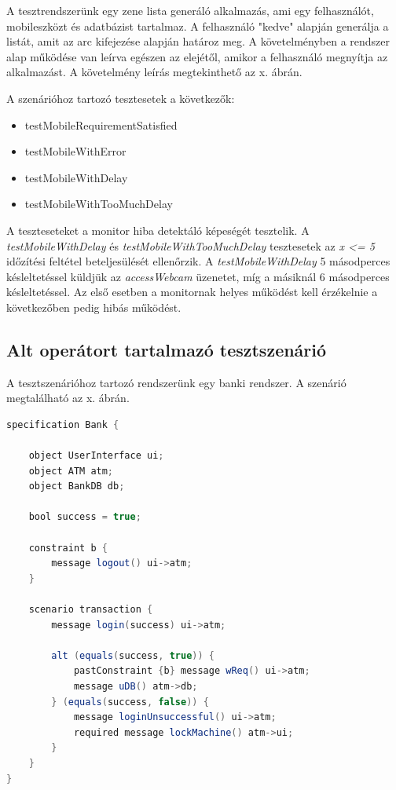 A tesztrendszerünk egy zene lista generáló alkalmazás, ami egy felhasználót, mobileszközt és adatbázist tartalmaz.
A felhasználó "kedve" alapján generálja a listát, amit az arc kifejezése alapján határoz meg.
A követelményben a rendszer alap működése van leírva egészen az elejétől, amikor a felhasználó megnyítja az alkalmazást.
A követelmény leírás megtekinthető az x. ábrán.

A szenárióhoz tartozó tesztesetek a következők:

\begin{itemize}
    \item testMobileRequirementSatisfied
    \item testMobileWithError
    \item testMobileWithDelay
    \item testMobileWithTooMuchDelay
\end{itemize}

A teszteseteket a monitor hiba detektáló képeségét tesztelik.
A \textit{testMobileWithDelay} és \textit{testMobileWithTooMuchDelay} tesztesetek az \textit{x <= 5} időzítési feltétel beteljesülését ellenőrzik.
A \textit{testMobileWithDelay} 5 másodperces késleltetéssel küldjük az \textit{accessWebcam} üzenetet, míg a másiknál 6 másodperces késleltetéssel.
Az első esetben a monitornak helyes működést kell érzékelnie a következőben pedig hibás működést.

\subsection{Alt operátort tartalmazó tesztszenárió}

A tesztszenárióhoz tartozó rendszerünk egy banki rendszer.
A szenárió megtalálható az x. ábrán.

\begin{lstlisting}[language=java, frame=single, float=ht!, caption={Integrációs teszteset.},captionpos=b]
specification Bank {

    object UserInterface ui;
    object ATM atm;
    object BankDB db;

    bool success = true;

    constraint b {
        message logout() ui->atm;
    }

    scenario transaction {
        message login(success) ui->atm;

        alt (equals(success, true)) {
            pastConstraint {b} message wReq() ui->atm;
            message uDB() atm->db;
        } (equals(success, false)) {
            message loginUnsuccessful() ui->atm;
            required message lockMachine() atm->ui;
        }
    }
}
\end{lstlisting}

